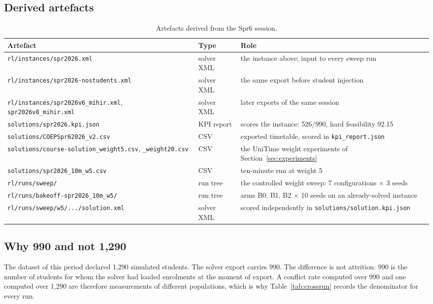\subsection{Derived artefacts}

\begin{table}[H]
\centering
\caption{Artefacts derived from the Spr6 session.}
\label{tab:spr6art}
\footnotesize
\begin{tabular}{@{}L{5.4cm}L{2.0cm}L{7.0cm}@{}}
\toprule
\textbf{Artefact} & \textbf{Type} & \textbf{Role} \\
\midrule
\texttt{rl/instances/spr2026.xml}            & solver XML & the instance above; input to every sweep run \\
\texttt{rl/instances/spr2026-nostudents.xml} & solver XML & the same export before student injection \\
\texttt{rl/instances/spr2026v6\_mihir.xml},
  \texttt{spr2026v8\_mihir.xml}              & solver XML & later exports of the same session \\
\texttt{solutions/spr2026.kpi.json}          & KPI report & scores the instance: 526/990, hard feasibility 92.15 \\
\texttt{solutions/COEPSpr62026\_v2.csv}      & CSV        & exported timetable, scored in \texttt{kpi\_report.json} \\
\texttt{solutions/course-solution\_weight5.csv},
  \texttt{\_weight20.csv}                    & CSV        & the UniTime weight experiments of Section~\ref{sec:experiments} \\
\texttt{solutions/spr2026\_10m\_w5.csv}      & CSV        & ten-minute run at weight 5 \\
\texttt{rl/runs/sweep/}                      & run tree   & the controlled weight sweep: 7 configurations $\times$ 3 seeds \\
\texttt{rl/runs/bakeoff-spr2026\_10m\_w5/}   & run tree   & arms B0, B1, B2 $\times$ 10 seeds on an already-solved instance \\
\texttt{rl/runs/sweep/w5/.../solution.xml}   & solver XML & scored independently in \texttt{solutions/solution.kpi.json} \\
\bottomrule
\end{tabular}
\end{table}

\subsection{Why 990 and not 1{,}290}

The dataset of this period declared 1{,}290 simulated students. The solver export carries 990. The
difference is not attrition: 990 is the number of students for whom the solver had loaded
enrolments at the moment of export. A conflict rate computed over 990 and one computed over
1{,}290 are therefore measurements of different populations, which is why
Table~\ref{tab:crossrun} records the denominator for every run.
